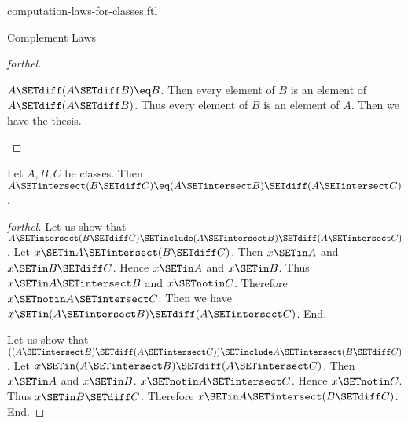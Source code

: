 \documentclass{naproche-library}
\begin{document}
\begin{smodule}[title=Computation Laws For Classes]{computation-laws-for-classes.ftl}
\begin{sfragment}{Complement Laws}
\begin{proof}[forthel]
    \begin{case}{$A \SETdiff (A \SETdiff B) \eq B$.}
      Then every element of $B$ is an element of $A \SETdiff (A \SETdiff B)$.
      Thus every element of $B$ is an element of $A$.
      Then we have the thesis.
    \end{case}
  \end{proof}

  \begin{proposition}[forthel,id=FOUNDATIONS_02_5811954316738560]
    Let $A, B, C$ be classes.
    Then $A \SETintersect (B \SETdiff C) \eq (A \SETintersect B) \SETdiff (A \SETintersect C)$.
  \end{proposition}
  \begin{proof}[forthel]
    Let us show that $A \SETintersect (B \SETdiff C) \SETinclude (A \SETintersect B) \SETdiff (A \SETintersect C)$.
      Let $x \SETin A \SETintersect (B \SETdiff C)$.
      Then $x \SETin A$ and $x \SETin B \SETdiff C$.
      Hence $x \SETin A$ and $x \SETin B$.
      Thus $x \SETin A \SETintersect B$ and $x \SETnotin C$.
      Therefore $x \SETnotin A \SETintersect C$.
      Then we have $x \SETin (A \SETintersect B) \SETdiff (A \SETintersect C)$.
    End.

    Let us show that $((A \SETintersect B) \SETdiff (A \SETintersect C)) \SETinclude A \SETintersect (B \SETdiff C)$. %
      Let $x \SETin (A \SETintersect B) \SETdiff (A \SETintersect C)$.
      Then $x \SETin A$ and $x \SETin B$.
      $x \SETnotin A \SETintersect C$.
      Hence $x \SETnotin C$.
      Thus $x \SETin B \SETdiff C$.
      Therefore $x \SETin A \SETintersect (B \SETdiff C)$.
    End.
  \end{proof}
\end{sfragment}
\end{smodule}
\end{document}
